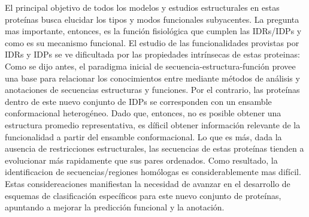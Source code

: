 El principal objetivo de todos los modelos y estudios estructurales en estas proteínas busca elucidar los tipos y modos funcionales subyacentes.
La pregunta mas importante, entonces, es la función fisiológica que cumplen las IDRs/IDPs y como es su mecanismo funcional.
El estudio de las funcionalidades provistas por IDRs y IDPs se ve dificultada por las propiedades intrínsecas de estas proteinas:
Como se dijo antes, el paradigma inicial de secuencia-estructura-función provee una base para relacionar los conocimientos entre mediante métodos de análisis y anotaciones de secuencias estructuras y funciones.
Por el contrario, las proteínas dentro de este nuevo conjunto de IDPs se corresponden con un ensamble conformacional heterogéneo.
Dado que, entonces, no es posible obtener una estructura promedio representativa, es díficil obtener información relevante de la funcionalidad a partir del ensamble conformacional.
Lo que es más, dada la ausencia de restricciones estructurales, las secuencias de estas proteínas tienden a evolucionar más rapidamente que sus pares ordenados.
Como resultado, la identificacion de secuencias/regiones homólogas es considerablemente mas difícil.
Estas considereaciones manifiestan la necesidad de avanzar en el desarrollo de esquemas de clasificación específicos para este nuevo conjunto de proteínas, apuntando a mejorar la predicción funcional y la anotación.

